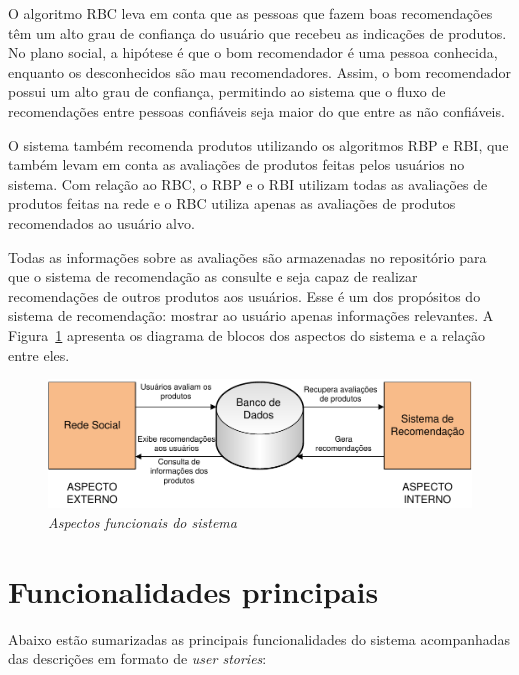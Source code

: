  O algoritmo RBC leva em conta que as pessoas que fazem boas recomendações têm um alto grau de confiança do usuário que recebeu as indicações de produtos. No plano social, a hipótese é que o bom recomendador é uma pessoa conhecida, enquanto os desconhecidos são mau recomendadores. Assim, o bom recomendador possui um alto grau de confiança, permitindo ao sistema que o fluxo de recomendações entre pessoas confiáveis seja maior do que entre as não confiáveis.
 
 O sistema também recomenda produtos utilizando os algoritmos RBP e RBI, que também levam em conta as avaliações de produtos feitas pelos usuários no sistema. Com relação ao RBC, o RBP e o RBI utilizam todas as avaliações de produtos feitas na rede e o RBC utiliza apenas as avaliações de produtos recomendados ao usuário alvo.
 
 Todas as informações sobre as avaliações são armazenadas no repositório para que o sistema de recomendação as consulte e seja capaz de realizar recomendações de outros produtos aos usuários. Esse é um dos propósitos do sistema de recomendação: mostrar ao usuário apenas informações relevantes. A Figura~\ref{fig:aspectos_funcionais} apresenta os diagrama de blocos dos aspectos do sistema e a relação entre eles.
 
\begin{figure}
 \centering
 \includegraphics[width=\textwidth]{imagens/Implementacao_Detalhe2}
 \caption{\it Aspectos funcionais do sistema}
 \label{fig:aspectos_funcionais}
\end{figure}

\section{Funcionalidades principais} %
\label{sec:funcionalidades_principais}

Abaixo estão sumarizadas as principais funcionalidades do sistema acompanhadas das descrições em formato de \textit{user stories}\cite{557458}:

